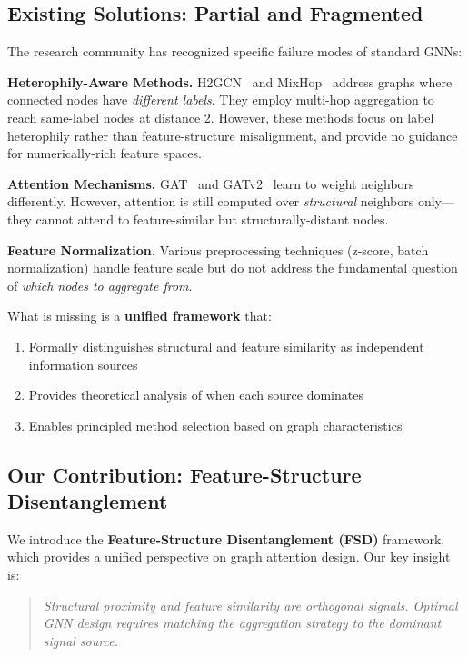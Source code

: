 \subsection{Existing Solutions: Partial and Fragmented}

The research community has recognized specific failure modes of standard GNNs:

\textbf{Heterophily-Aware Methods.} H2GCN~\cite{zhu2020beyond} and MixHop~\cite{abu2019mixhop} address graphs where connected nodes have \textit{different labels}. They employ multi-hop aggregation to reach same-label nodes at distance 2. However, these methods focus on label heterophily rather than feature-structure misalignment, and provide no guidance for numerically-rich feature spaces.

\textbf{Attention Mechanisms.} GAT~\cite{velivckovic2018gat} and GATv2~\cite{brody2022gatv2} learn to weight neighbors differently. However, attention is still computed over \textit{structural} neighbors only---they cannot attend to feature-similar but structurally-distant nodes.

\textbf{Feature Normalization.} Various preprocessing techniques (z-score, batch normalization) handle feature scale but do not address the fundamental question of \textit{which nodes to aggregate from}.

What is missing is a \textbf{unified framework} that:
\begin{enumerate}
    \item Formally distinguishes structural and feature similarity as independent information sources
    \item Provides theoretical analysis of when each source dominates
    \item Enables principled method selection based on graph characteristics
\end{enumerate}

\subsection{Our Contribution: Feature-Structure Disentanglement}

We introduce the \textbf{Feature-Structure Disentanglement (FSD)} framework, which provides a unified perspective on graph attention design. Our key insight is:

\begin{quote}
\textit{Structural proximity and feature similarity are orthogonal signals. Optimal GNN design requires matching the aggregation strategy to the dominant signal source.}
\end{quote}


